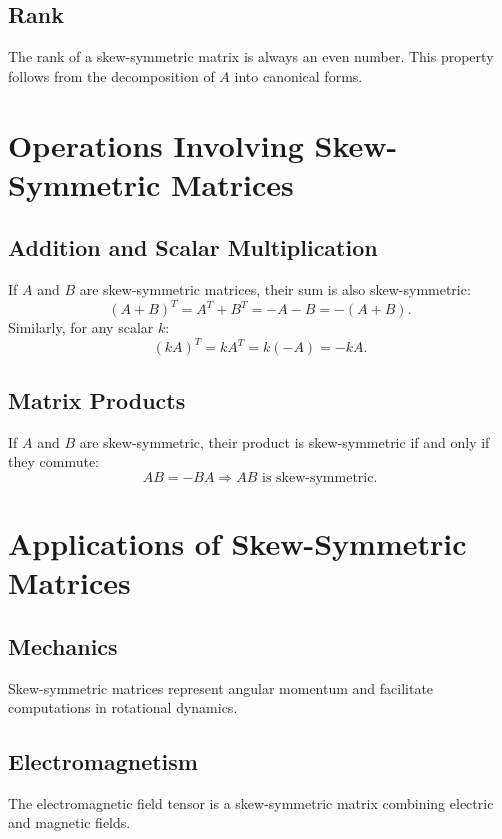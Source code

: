 \documentclass[a4paper,12pt]{article}
\begin{document}
	\subsection{Rank}
	The rank of a skew-symmetric matrix is always an even number. This property follows from the decomposition of $A$ into canonical forms.
	
	\section{Operations Involving Skew-Symmetric Matrices}
	
	\subsection{Addition and Scalar Multiplication}
	If $A$ and $B$ are skew-symmetric matrices, their sum is also skew-symmetric:
	\begin{equation}
		(A + B)^T = A^T + B^T = -A - B = -(A+B).
	\end{equation}
	Similarly, for any scalar $k$:
	\begin{equation}
		(kA)^T = kA^T = k(-A) = -kA.
	\end{equation}
	
	\subsection{Matrix Products}
	If $A$ and $B$ are skew-symmetric, their product is skew-symmetric if and only if they commute:
	\begin{equation}
		AB = -BA \Rightarrow AB \text{ is skew-symmetric}.
	\end{equation}
	
	\section{Applications of Skew-Symmetric Matrices}
	
	\subsection{Mechanics}
	Skew-symmetric matrices represent angular momentum and facilitate computations in rotational dynamics.
	
	\subsection{Electromagnetism}
	The electromagnetic field tensor is a skew-symmetric matrix combining electric and magnetic fields.
	
\end{document}
